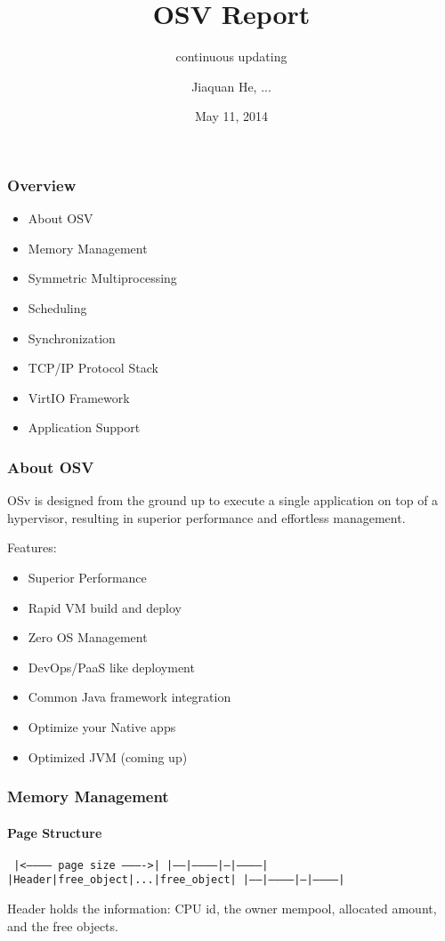 \documentclass[10pt]{beamer}
\title{OSV Report}
\subtitle{continuous updating}
\author[Jiaquan He, ...]{Jiaquan He, ...}
\institute[THCSOS]{
	THCSOS
}
\date{May 11, 2014}
\begin{document}
\begin{frame}[plain]
	\titlepage
\end{frame}


\begin{frame}
	\frametitle{Overview}

\begin{itemize}
	\item About OSV
	\item Memory Management
	\item Symmetric Multiprocessing
	\item Scheduling
	\item Synchronization
	\item TCP/IP Protocol Stack
	\item VirtIO Framework
	\item Application Support
\end{itemize}

\end{frame}


\begin{frame}
	\frametitle{About OSV}

	OSv is designed from the ground up to execute a single application on top of a hypervisor, resulting in superior performance and effortless management.

	\bigskip
	\pause

	Features: 
	\begin{itemize}
		\item Superior Performance
		\item Rapid VM build and deploy
		\item Zero OS Management
		\item DevOps/PaaS like deployment
		\item Common Java framework integration
		\item Optimize your Native apps
		\item Optimized JVM (coming up)
	\end{itemize}

\end{frame}


\begin{frame}
	\frametitle{Memory Management}
	\framesubtitle{Page Structure}
	
	\center
	\texttt{
	|<----------- page size ---------->|
	|------|-----------|---|-----------|
	|Header|free\_object|...|free\_object|
	|------|-----------|---|-----------|
	}
	
\medskip

	Header holds the information: CPU id, the owner mempool, allocated amount, and the free objects.
	
\end{frame}
\end{document}
